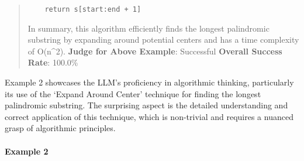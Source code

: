 \documentclass[fleqn,10pt]{wlscirep}
\begin{document}
\begin{quote}
\begin{verbatim}
    return s[start:end + 1]
\end{verbatim}

In summary, this algorithm efficiently finds the longest palindromic
substring by expanding around potential centers and has a time
complexity of O(n\^{}2). \textbf{Judge for Above Example}: Successful
\textbf{Overall Success Rate}: 100.0\%
\end{quote}

Example 2 showcases the LLM's proficiency in algorithmic thinking,
particularly its use of the `Expand Around Center' technique for finding
the longest palindromic substring. The surprising aspect is the detailed
understanding and correct application of this technique, which is
non-trivial and requires a nuanced grasp of algorithmic principles.

\hypertarget{example-2-11}{%
\paragraph{Example 2}\label{example-2-11}}
\end{document}
